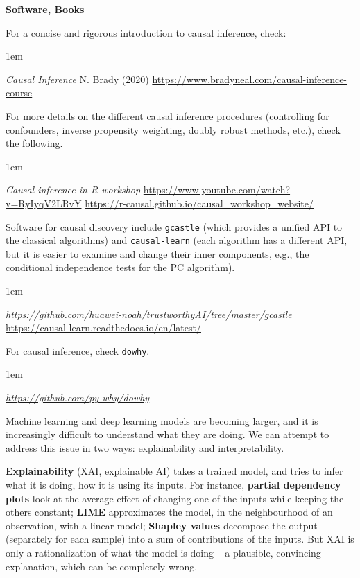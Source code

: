 \documentclass[a5paper]{article}
\let\d\textbf
\newenvironment{reference}{%
  \medskip\goodbreak
  \parskip 0pt
  \raggedright
  \leftskip 1em
  \obeylines
}{\par\medskip\goodbreak}
\def\section#1{\clearpage{\vspace*{0cm}\LARGE\centering\bfseries #1\par\bigskip\bigskip}}
\def\subsection#1{{\par\bigskip\goodbreak\large\bfseries #1\par}}
\begin{document}
\subsection{Software, Books}

For a concise and rigorous introduction to causal inference, check:

\begin{reference}
  \emph{Causal Inference}
  N. Brady (2020)
  \url{https://www.bradyneal.com/causal-inference-course}
\end{reference}

For more details on the different causal inference procedures
(controlling for confounders, inverse propensity weighting,
doubly robust methods, etc.), check the following.

\begin{reference}
  \emph{Causal inference in R workshop}
  \url{https://www.youtube.com/watch?v=RyIyqV2LRvY}
  \url{https://r-causal.github.io/causal_workshop_website/}
\end{reference}

Software for causal discovery include \texttt{gcastle} (which provides a unified API
to the classical algorithms) and \texttt{causal-learn} (each algorithm has a different API,
but it is easier to examine and change their inner components, e.g., the
conditional independence tests for the PC algorithm).

\begin{reference}
  \emph{\url{https://github.com/huawei-noah/trustworthyAI/tree/master/gcastle}}
  \url{https://causal-learn.readthedocs.io/en/latest/}
\end{reference}

For causal inference, check \texttt{dowhy}.

\begin{reference}
  \emph{\url{https://github.com/py-why/dowhy}}
\end{reference}

\section{Explainable / Interpretable AI}

Machine learning and deep learning models are becoming larger, and it is increasingly difficult
to understand what they are doing.
We can attempt to address this issue in two ways:
explainability and interpretability.

\d{Explainability} (XAI, explainable AI) takes a trained model,
and tries to infer what it is doing, how it is using its inputs.
For instance,
\d{partial dependency plots} look at the average effect of changing one of the inputs while keeping the others constant; 
\d{LIME} approximates the model, in the neighbourhood of an observation, with a linear model;
\d{Shapley values} decompose the output (separately for each sample) into a sum of contributions of the inputs.
But XAI is only a rationalization of what the model is doing -- a plausible, convincing explanation,
which can be completely wrong.
\end{document}
